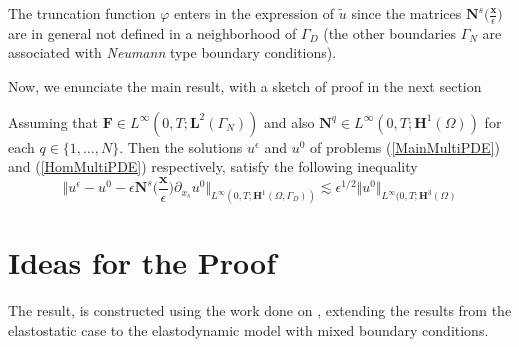 
\begin{rem}
The truncation function $\varphi$ enters in the expression of $\tilde{u}$ since the matrices $\mathbf{N}^s \big(\frac{\mathbf{x}}{\epsilon}\big)$ are in general not defined in a neighborhood of $\Gamma_D$ (the other boundaries $\Gamma_N$ are associated with \textit{Neumann} type boundary conditions).
\end{rem}

Now, we enunciate the main result, with a sketch of proof in the next section
\begin{theo}
Assuming that $\mathbf{F} \in L^{\infty}(0,T;\mathbf{L}^{2}(\Gamma_N))$ and also $\mathbf{N}^q \in L^{\infty}(0,T; \mathbf{H}^1(\Omega))$ for each $q \in \{1,\dots, N\}$. Then the solutions $u^{\epsilon}$ and $u^0$ of problems (\ref{MainMultiPDE}) and (\ref{HomMultiPDE}) respectively, satisfy the following inequality
\begin{equation*}
    \label{MainInequality}
    \Vert u^{\epsilon} - u^0 - \epsilon \mathbf{N}^s \big(\frac{\mathbf{x}}{\epsilon} \big) \partial_{x_s} u^0 \Vert_{L^{\infty}(0,T; \mathbf{H}^1(\Omega, \Gamma_D))} \lesssim \epsilon^{1/2} \Vert u^0 \Vert_{L^{\infty}(0,T; \mathbf{H}^{3}(\Omega)}
\end{equation*}
\end{theo}

\section{Ideas for the Proof}
The result, is constructed using the work done on \cite{oleinik1992mathematical}, extending the results from the elastostatic case to the elastodynamic model with mixed boundary conditions.

